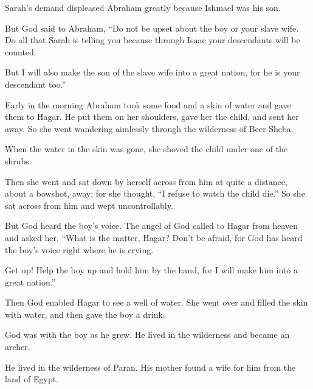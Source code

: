 \begin{scripture}
 Sarah's demand displeased Abraham greatly because Ishmael was his son.
 But God said to Abraham, ``Do not be upset about the boy or your slave wife. Do all that Sarah is telling you because through Isaac your descendants will be counted.
 But I will also make the son of the slave wife into a great nation, for he is your descendant too.''
\everypar{}

 Early in the morning Abraham took some food and a skin of water and gave them to Hagar. He put them on her shoulders, gave her the child, and sent her away. So she went wandering aimlessly through the wilderness of Beer Sheba.
 When the water in the skin was gone, she shoved the child under one of the shrubs.
 Then she went and sat down by herself across from him at quite a distance, about a bowshot, away; for she thought, ``I refuse to watch the child die.'' So she sat across from him and wept uncontrollably.
\everypar{}

 But God heard the boy's voice. The angel of God called to Hagar from heaven and asked her, ``What is the matter, Hagar? Don't be afraid, for God has heard the boy's voice right where he is crying.
 Get up! Help the boy up and hold him by the hand, for I will make him into a great nation.''
 Then God enabled Hagar to see a well of water. She went over and filled the skin with water, and then gave the boy a drink.
\everypar{}

 God was with the boy as he grew. He lived in the wilderness and became an archer.
 He lived in the wilderness of Paran. His mother found a wife for him from the land of Egypt.
\everypar{}


\end{scripture}
